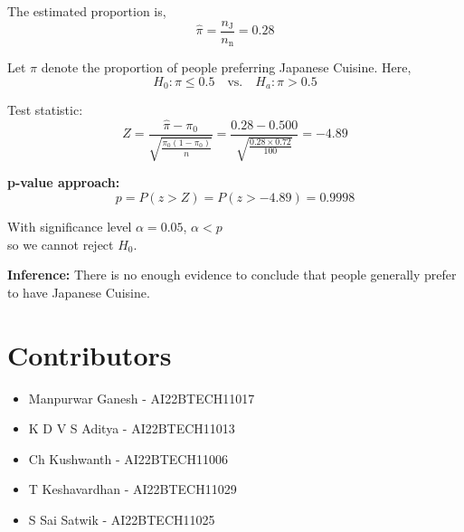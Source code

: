 \documentclass[12pt]{article}
\begin{document}
    The estimated proportion is,
    \begin{equation}
        \hat{\pi} = \frac{n_{\text{J}}}{n_{\text{n}}} = 0.28
    \end{equation}
    
    Let $\pi$ denote the proportion of people preferring Japanese Cuisine. Here,
    \begin{equation}
        H_0: \pi \leq 0.5 \quad \text{vs.} \quad H_a: \pi > 0.5
    \end{equation}

    Test statistic:
    \begin{equation}
        Z = \frac{\hat{\pi} - \pi_0}{\sqrt{\frac{\pi_0(1-\pi_0)}{n}}} = \frac{0.28 - 0.500}{\sqrt{\frac{0.28 \times 0.72}{100}}} = -4.89
    \end{equation}
    
    \textbf{p-value approach:}
    \begin{equation}
        p = P(z > Z) = P(z > -4.89) = 0.9998
    \end{equation}

    With significance level   \( \alpha = 0.05 \), \( \alpha < p \) 
    \\ so we cannot reject \( H_0 \).
     \medskip

\textbf{Inference:} There is no enough evidence to conclude that people generally prefer to have Japanese Cuisine.
\newpage
\section{Contributors}
    \begin{itemize}
        \item Manpurwar Ganesh - AI22BTECH11017
        \item K D V S Aditya - AI22BTECH11013
        \item Ch Kushwanth - AI22BTECH11006
        \item T Keshavardhan - AI22BTECH11029
        \item S Sai Satwik - AI22BTECH11025
    \end{itemize}
\end{document}
